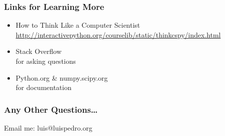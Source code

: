 \begin{frame}[fragile]
\frametitle{Links for Learning More}

\begin{itemize}
\item How to Think Like a Computer Scientist
    \url{http://interactivepython.org/courselib/static/thinkcspy/index.html}
\item Stack Overflow \\
    for asking questions
\item Python.org \& numpy.scipy.org \\
    for documentation
\end{itemize}

\end{frame}

\begin{frame}[fragile]
\frametitle{Any Other Questions\ldots}
Email me: luis@luispedro.org
\end{frame}




